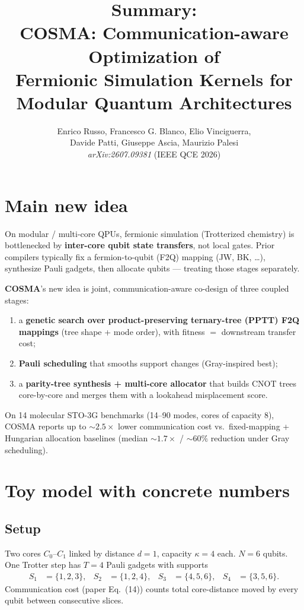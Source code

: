 \documentclass[11pt]{article}
\title{Summary:\\COSMA: Communication-aware Optimization of\\Fermionic Simulation Kernels for Modular Quantum Architectures}
\author{Enrico Russo, Francesco G. Blanco, Elio Vinciguerra,\\Davide Patti, Giuseppe Ascia, Maurizio Palesi\\
\textit{arXiv:2607.09381} (IEEE QCE 2026)}
\date{}
\begin{document}
\maketitle

\section{Main new idea}

On modular / multi-core QPUs, fermionic simulation (Trotterized chemistry) is bottlenecked by
\textbf{inter-core qubit state transfers}, not local gates.
Prior compilers typically fix a fermion-to-qubit (F2Q) mapping (JW, BK, \ldots), synthesize Pauli
gadgets, then allocate qubits --- treating those stages separately.

\textbf{COSMA}'s new idea is joint, communication-aware co-design of three coupled stages:
\begin{enumerate}[leftmargin=*,itemsep=2pt]
  \item a \textbf{genetic search over product-preserving ternary-tree (PPTT) F2Q mappings}
        (tree shape + mode order), with fitness $=$ downstream transfer cost;
  \item \textbf{Pauli scheduling} that smooths support changes (Gray-inspired best);
  \item a \textbf{parity-tree synthesis + multi-core allocator} that builds CNOT trees
        core-by-core and merges them with a lookahead misplacement score.
\end{enumerate}
On 14 molecular STO-3G benchmarks (14--90 modes, cores of capacity 8), COSMA reports up to
$\sim\!2.5\times$ lower communication cost vs.\ fixed-mapping + Hungarian allocation baselines
(median $\sim\!1.7\times$ / $\sim\!60\%$ reduction under Gray scheduling).

\section{Toy model with concrete numbers}

\subsection*{Setup}
Two cores $C_0$--$C_1$ linked by distance $d=1$, capacity $\kappa=4$ each.
$N=6$ qubits. One Trotter step has $T=4$ Pauli gadgets with supports
\[
\begin{aligned}
S_1&=\{1,2,3\},&
S_2&=\{1,2,4\},&
S_3&=\{4,5,6\},&
S_4&=\{3,5,6\}.
\end{aligned}
\]
Communication cost (paper Eq.~(14)) counts total core-distance moved by every qubit
between consecutive slices.
\end{document}
